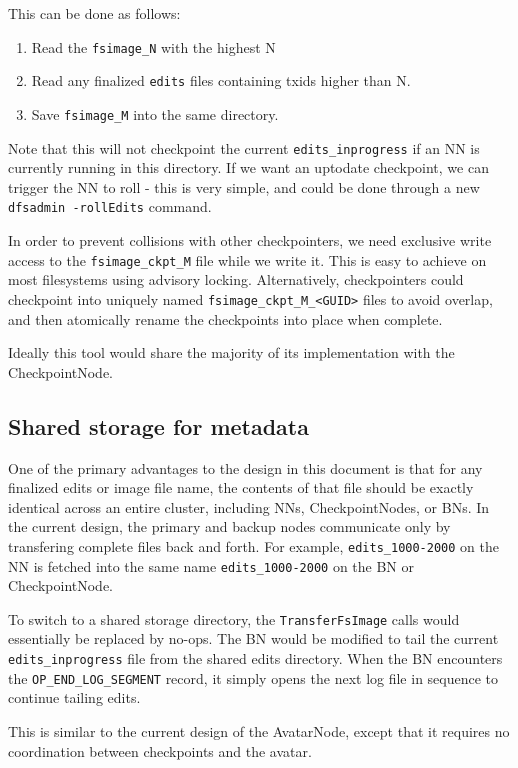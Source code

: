 \documentclass{article}
\begin{document}
This can be done as follows:
\begin{enumerate}
\item Read the {\tt fsimage\_N} with the highest N
\item Read any finalized {\tt edits} files containing txids higher than N.
\item Save {\tt fsimage\_M} into the same directory.
\end{enumerate}

Note that this will not checkpoint the current {\tt edits\_inprogress} if an NN is currently running in this directory. If we want an uptodate checkpoint, we can trigger the NN to roll - this is very simple, and could be done through a new {\tt dfsadmin -rollEdits} command.

In order to prevent collisions with other checkpointers, we need exclusive write access to the {\tt fsimage\_ckpt\_M} file while we write it. This is easy to achieve on most filesystems using advisory locking. Alternatively, checkpointers could checkpoint into uniquely named {\tt fsimage\_ckpt\_M\_<GUID>} files to avoid overlap, and then atomically rename the checkpoints into place when complete.

Ideally this tool would share the majority of its implementation with the CheckpointNode.

\subsection{Shared storage for metadata}

One of the primary advantages to the design in this document is that for any finalized edits or image file name, the contents of that file should be exactly identical across an entire cluster, including NNs, CheckpointNodes, or BNs. In the current design, the primary and backup nodes communicate only by transfering complete files back and forth. For example, {\tt edits\_1000-2000} on the NN is fetched into the same name {\tt edits\_1000-2000} on the BN or CheckpointNode.

  To switch to a shared storage directory, the {\tt TransferFsImage} calls would essentially be replaced by no-ops. The BN would be modified to tail the current {\tt edits\_inprogress} file from the shared edits directory. When the BN encounters the {\tt OP\_END\_LOG\_SEGMENT} record, it simply opens the next log file in sequence to continue tailing edits.

This is similar to the current design of the AvatarNode, except that it requires no coordination between checkpoints and the avatar.
\end{document}
